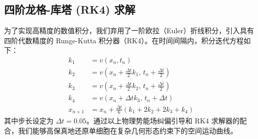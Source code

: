 \subsection{四阶龙格-库塔 (RK4) 求解}
为了实现高精度的数值积分，我们弃用了一阶欧拉（Euler）折线积分，引入具有四阶代数精度的 Runge-Kutta 积分器（RK4）\cite{Butcher2016}。在时间间隔内，积分迭代方程如下：
\begin{align}
    k_1 &= v(x_n, t_n) \\
    k_2 &= v\left(x_n + \frac{\Delta t}{2} k_1, \, t_n + \frac{\Delta t}{2}\right) \\
    k_3 &= v\left(x_n + \frac{\Delta t}{2} k_2, \, t_n + \frac{\Delta t}{2}\right) \\
    k_4 &= v\left(x_n + \Delta t k_3, \, t_n + \Delta t\right) \\
    x_{n+1} &= x_n + \frac{\Delta t}{6} \left( k_1 + 2k_2 + 2k_3 + k_4 \right)
\end{align}
其中步长设定为 $\Delta t = 0.05$。通过以上物理势能场纠偏引导和 RK4 求解器的配合，我们能够高保真地还原单细胞在复杂几何形态约束下的空间运动曲线。

